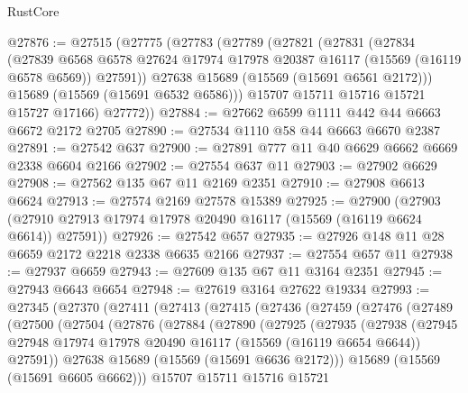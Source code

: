 \begin{lexlean}{RustCore}
\begin{coremodule}
@27876 := @27515
    (@27775
      (@27783
        (@27789
          (@27821
            (@27831
              (@27834
                (@27839
                  @6568
                  @6578
                  @27624
                  @17974
                  @17978
                  @20387
                  @16117
                  (@15569 (@16119 @6578 @6569))
                  @27591))
              @27638
              @15689
              (@15569 (@15691 @6561 @2172)))
            @15689
            (@15569 (@15691 @6532 @6586)))
          @15707
          @15711
          @15716
          @15721
          @15727
          @17166)
        @27772))
@27884 := @27662 @6599 @1111 @442 @44 @6663 @6672 @2172 @2705
@27890 := @27534 @1110 @58 @44 @6663 @6670 @2387
@27891 := @27542 @637
@27900 := @27891 @777 @11 @40 @6629 @6662 @6669 @2338 @6604 @2166
@27902 := @27554 @637 @11
@27903 := @27902 @6629
@27908 := @27562 @135 @67 @11 @2169 @2351
@27910 := @27908 @6613 @6624
@27913 := @27574 @2169 @27578 @15389
@27925 := @27900
    (@27903 (@27910 @27913 @17974 @17978 @20490 @16117 (@15569 (@16119 @6624 @6614)) @27591))
@27926 := @27542 @657
@27935 := @27926 @148 @11 @28 @6659 @2172 @2218 @2338 @6635 @2166
@27937 := @27554 @657 @11
@27938 := @27937 @6659
@27943 := @27609 @135 @67 @11 @3164 @2351
@27945 := @27943 @6643 @6654
@27948 := @27619 @3164 @27622 @19334
@27993 := @27345
    (@27370
      (@27411
        (@27413
          (@27415
            (@27436
              (@27459
                (@27476
                  (@27489
                    (@27500
                      (@27504
                        (@27876
                          (@27884
                            (@27890
                              (@27925
                                (@27935
                                  (@27938
                                    (@27945
                                      @27948
                                      @17974
                                      @17978
                                      @20490
                                      @16117
                                      (@15569 (@16119 @6654 @6644))
                                      @27591))
                                  @27638
                                  @15689
                                  (@15569 (@15691 @6636 @2172)))
                                @15689
                                (@15569 (@15691 @6605 @6662)))
                              @15707
                              @15711
                              @15716
                              @15721

\end{coremodule}
\end{lexlean}
